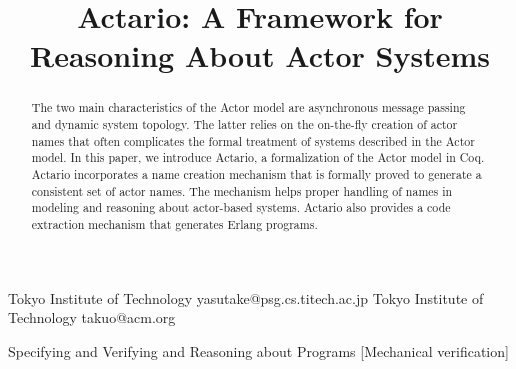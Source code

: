 \documentclass[10pt]{sigplanconf}
\begin{document}
\setlength{\pdfpageheight}{\paperheight}
\setlength{\pdfpagewidth}{\paperwidth}






\title{Actario: A Framework for Reasoning About Actor Systems}

           {Tokyo Institute of Technology}
           {yasutake@psg.cs.titech.ac.jp}
           {Tokyo Institute of Technology}
           {takuo@acm.org}

\maketitle

\begin{abstract}
The two main characteristics of the Actor model are asynchronous message passing and dynamic system topology. The latter relies on the on-the-fly creation of actor names that often complicates the formal treatment of systems described in the Actor model. In this paper, we introduce Actario, a formalization of the Actor model in Coq. Actario incorporates a name creation mechanism that is formally proved to generate a consistent set of actor names. The mechanism helps proper handling of names in modeling and reasoning about actor-based systems. Actario also provides a code extraction mechanism that generates Erlang programs.
\end{abstract}

%
{Specifying and Verifying and Reasoning about Programs}%
[Mechanical verification]
\end{document}
